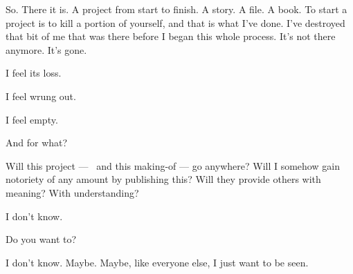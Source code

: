 \resetbackgroundcolor
\begin{paracol}{2}
\begin{leftcolumn}
\null
\vfill
\noindent So. There it is. A project from start to finish. A story. A file. A book. To start a project is to kill a portion of yourself, and that is what I've done. I've destroyed that bit of me that was there before I began this whole process. It's not there anymore. It's gone.

I feel its loss.

I feel wrung out.

I feel empty.

And for what?

Will this project --- \allyWord\ and this making-of --- go anywhere? Will I somehow gain notoriety of any amount by publishing this? Will they provide others with meaning? With understanding?

I don't know.

\begin{ally}
	Do you want to?
\end{ally}
I don't know. Maybe. Maybe, like everyone else, I just want to be seen.
\vfill
\clearpage
\end{leftcolumn}
\end{paracol}
